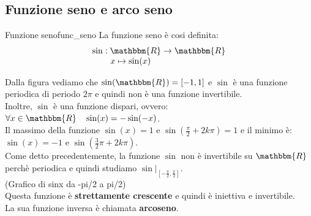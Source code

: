 \documentclass[12pt]{report}
\newcounter{definition}
\newcommand{\nmu}{}
\begin{document}
	\subsection{Funzione seno e arco seno}
	\begin{definition}{\nmu Funzione seno}{func_seno}
		La funzione seno è cosi definita:
		\[
		\begin{array}{l}
			\sin: \mathbbm{R} \to \mathbbm{R} \\
			\phantom{\sin:\ }x \mapsto \sin(x)
		\end{array}
		\]
	\end{definition}
	\begin{center}
	\end{center}
	Dalla figura vediamo che $\sin(\mathbbm{R})=[-1,1]$ e $\sin$ è una funzione periodica di periodo $2\pi$ e quindi non è una funzione invertibile. \\
	Inoltre, $\sin$ è una funzione dispari, ovvero: $\forall x \in \mathbbm{R} \quad \sin(x)=-\sin(-x)$. \\
	Il massimo della funzione $\sin(x)=1$ e $\sin(\frac{\pi}{2}+2k\pi)=1$ e il minimo è: $\sin(x)=-1$ e $\sin(\frac{3}{2}\pi + 2k\pi)$. \\
	Come detto precedentemente, la funzione $\sin$ non è invertibile su $\mathbbm{R}$ perchè periodica e quindi studiamo $\sin|_{[-\frac{\pi}{2}, \frac{\pi}{2}]}$. \\
	(Grafico di sinx da -pi/2 a pi/2) \\
	Questa funzione è \textbf{strettamente crescente} e quindi è iniettiva e invertibile. \\
	La sua funzione inversa è chiamata \textbf{arcoseno}.
\end{document}
